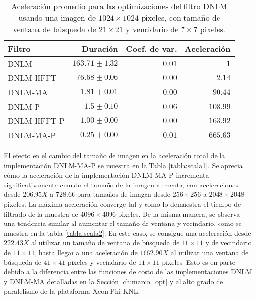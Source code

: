 \begin{table}
\protect\caption[Aceleraci\'on promedio de optimizaciones del filtro DNLM]{Aceleraci\'on promedio para las optimizaciones del filtro DNLM usando una imagen de  $1024 \times 1024$ pixeles, con tama\~no de ventana de b\'usqueda de $21 \times 21$ y vencidario de $7 \times 7$ pixeles. \label{tabla:speedup}}
\centering
\begin{tabular}{lrrr}
Filtro & Duraci\'on \left[s\right]& Coef. de var. & Aceleraci\'on \left[x\right]\tabularnewline
\hline
DNLM & $163.71\pm1.32$ & $0.01$ & $1$\tabularnewline
DNLM-IIFFT & $76.68\pm0.06$ & $0.00$ & $2.14$\tabularnewline
DNLM-MA & $1.81\pm 0.01$ & $0.00$ & $90.44$ \tabularnewline
DNLM-P & $1.5\pm0.10$ & $0.06$ & $108.99$\tabularnewline
DNLM-IIFFT-P & $1.00\pm0.00$ & $0.00$ & $163.92$ \tabularnewline 
DNLM-MA-P & $\boldsymbol{0.25\pm0.00}$ & $\boldsymbol{0.01}$ &  $\boldsymbol{665.63}$\tabularnewline
\end{tabular}
\end{table}


El efecto en el cambio del tama\~no de imagen en la aceleraci\'on total de la implementaci\'on DNLM-MA-P se muestra en la Tabla \ref{tabla:scala1}. Se aprecia c\'omo la aceleraci\'on de la implementaci\'on DNLM-MA-P incrementa significativamente cuando el tama\~no de la imagen aumenta, con aceleraciones desde $206.95X$ a $728.66$ para tama\~nos de imagen desde $256 \times 256$ a $2048 \times 2048$ pixeles. La m\'axima aceleraci\'on converge tal y como lo demuestra el tiempo de filtrado de la muestra de $4096\times 4096$ pixeles.  
De la misma manera, se observa una tendencia similar al aumentar el tama\~no de ventana y vecindario, como se muestra en la tabla \ref{tabla:scala2}. En este caso, se consigue una aceleraci\'on desde $222.43X$ al utilizar un tama\~no de ventana de b\'usqueda de $11 \times 11$ y de vecindario de $11 \times 11$, hasta llegar a una aceleraci\'on de $1662.90X$ al utilizar una ventana de b\'usqueda de $41 \times 41$ pixeles y vecindario de $11 \times 11$ pixeles. Esto es en parte debido a la diferencia entre las funciones de costo de las implementaciones DNLM y DNLM-MA detalladas en la Secci\'on \ref{ch:marco_opt} y al alto grado de paralelismo de la plataforma Xeon Phi KNL.


